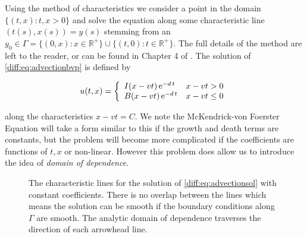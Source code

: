 \documentclass[../main.tex]{subfiles}
\begin{document}
  Using the method of characteristics we consider a point in the domain $\{(t, x) : t, x > 0 \}$ and solve the equation along some characteristic line $(t(s), x(s)) = y(s)$ stemming from an $y_0 \in \Gamma = \{ (0, x) : x \in \mathbb{R}^+ \} \cup \{ (t, 0) : t \in \mathbb{R}^+ \}$. The full details of the method are left to the reader, or can be found in Chapter 4 of \cite{holmes2006}.  The solution of \autoref{diff:eq:advectionbvp} is defined by

  \begin{equation} \label{diff:eq:advectionsol}
    u(t, x) = \left\lbrace \begin{array}{ll}
      I(x - v t) \operatorname{e}^{-d \, t} & x - vt > 0 \\
      B(x - v t) \operatorname{e}^{-d \, t} & x - vt \leq 0 \\
  \end{array} \right.
  \end{equation}

  along the characteristics $x - vt = C$. We note the McKendrick-von Foerster Equation will take a form similar to this if the growth and death terms are constants, but the problem will become more complicated if the coefficients are functions of $t, x$ or non-linear. However this problem does allow us to introduce the idea of \emph{domain of dependence}.

  \begin{figure}[htb]
    \centering

    \caption{The characteristic lines for the solution of \autoref{diff:eq:advectionsol} with constant coefficients. There is no overlap between the lines which means the solution can be smooth if the boundary conditions along $\Gamma$ are smooth. The analytic domain of dependence traverses the direction of each arrowhead line. \label{diff:fig:domainofdep}}
  \end{figure}
\end{document}
